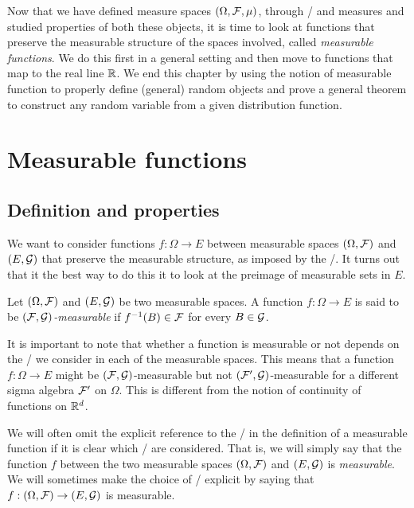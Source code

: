 
Now that we have defined measure spaces $(\Omega, \mathcal F, \mu)$, through \sigalgs/ and measures and studied properties of both these objects, it is time to look at functions that preserve the measurable structure of the spaces involved, called \emph{measurable functions}. We do this first in a general setting and then move to functions that map to the real line $\mathbb R$. We end this chapter by using the notion of measurable function to properly define (general) random objects and prove a general theorem to construct any random variable from a given distribution function.

\section{Measurable functions}


\subsection{Definition and properties}

We want to consider functions $f : \Omega \to E$ between measurable spaces $(\Omega, \mathcal F)$ and $(E, \mathcal G)$ that preserve the measurable structure, as imposed by the \sigalgs/. It turns out that it the best way to do this it to look at the preimage of measurable sets in $E$.

\begin{definition}\label{def:measurable_function}
Let $(\Omega, \mathcal F)$ and $(E, \mathcal G)$ be two measurable spaces. A function $f: \Omega \to E$ is said to be \emph{$(\mathcal F, \mathcal G)$-measurable} if $f^{-1}(B) \in \mathcal F$ for every $B \in \mathcal G$.
\end{definition}

It is important to note that whether a function is measurable or not depends on the \sigalgs/ we consider in each of the measurable spaces. This means that a function $f : \Omega \to E$ might be $(\mathcal F, \mathcal G)$-measurable but not $(\mathcal F^\prime, \mathcal G)$-measurable for a different sigma algebra $\mathcal F^\prime$ on $\Omega$. This is different from the notion of continuity of functions on $\mathbb R^d$. 

We will often omit the explicit reference to the \sigalgs/ in the definition of a measurable function if it is clear which \sigalgs/ are considered. That is, we will simply say that the function $f$ between the two measurable spaces $(\Omega, \mathcal F)$ and $(E, \mathcal G)$ is \emph{measurable}. We will sometimes make the choice of \sigalgs/ explicit by saying that $f: (\Omega, \mathcal F) \to (E, \mathcal G)$ is measurable.

